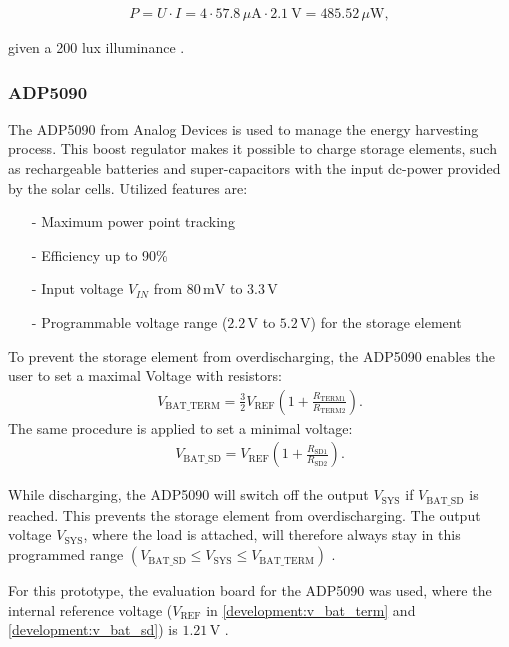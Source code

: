\begin{align}
	P = U\cdot I = 4\cdot 57.8\,\mu\text{A}\cdot 2.1\ \text{V}=485.52\,\mu \text{W},\label{development:cell_power}
\end{align}

given a 200 lux illuminance \cite{amorton}.

\subsubsection{ADP5090}
The ADP5090 from Analog Devices is used to manage the energy harvesting process.
This boost regulator makes it possible to charge storage elements, such as rechargeable batteries and super-capacitors with the input dc-power provided by the solar cells. Utilized features are:
\begin{itemize}
	\item[-] Maximum power point tracking
	\item[-] Efficiency up to 90\%
	\item[-] Input voltage $V_{IN}$ from $80\,\text{mV}$ to $3.3\,\text{V}$
	\item[-] Programmable voltage range ($2.2\,\text{V}$ to $5.2\,\text{V}$) for the storage element
\end{itemize}
To prevent the storage element from overdischarging, the ADP5090 enables the user to set a maximal Voltage with resistors:
\begin{align}
	V_{\text{BAT\_TERM}} = \frac{3}{2} V_{\text{REF}}\left(1+\frac{R_{\text{TERM1}}}{R_{\text{TERM2}}} \right).\label{development:v_bat_term} 
\end{align} 
The same procedure is applied to set a minimal voltage:
\begin{align}
	V_{\text{BAT\_SD}}=V_{\text{REF}} \left(1+\frac{R_{\text{SD1}}}{R_{\text{SD2}}} \right).\label{development:v_bat_sd} 
\end{align}  

While discharging, the ADP5090 will switch off the output $V_{\text{SYS}}$ if $V_{\text{BAT\_SD}}$ is reached. This prevents the storage element from overdischarging.
The output voltage $V_{\text{SYS}}$, where the load is attached, will therefore always stay in this programmed range $(V_{\text{BAT\_SD}}\le V_{\text{SYS}}\le V_{\text{BAT\_TERM}})$ \cite{adp}.

For this prototype, the evaluation board for the ADP5090 was used, where the internal reference voltage ($V_{\text{REF}}$ in \eqref{development:v_bat_term} and \eqref{development:v_bat_sd}) is $1.21\,\text{V}$ \cite{adp_eval}.


